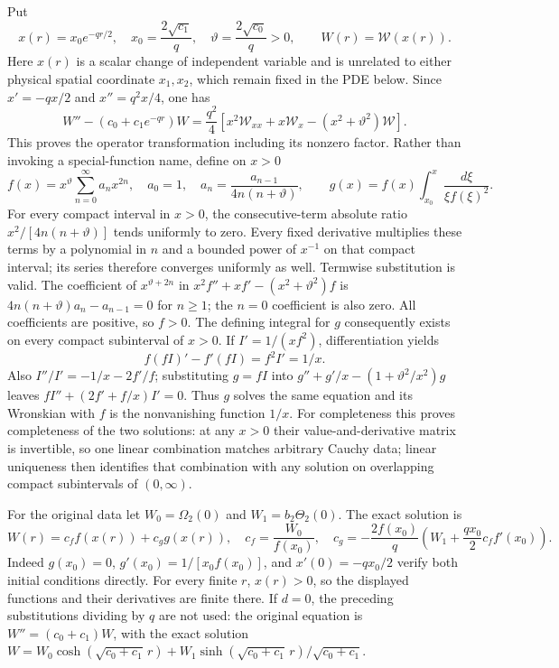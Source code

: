 Put
\[
 x(r)=x_0e^{-qr/2},\quad x_0=\frac{2\sqrt{c_1}}q,\quad
 \vartheta=\frac{2\sqrt{c_0}}q>0,\qquad W(r)=\mathcal W(x(r)).
\]
Here $x(r)$ is a scalar change of independent variable and is unrelated
to either physical spatial coordinate $x_1,x_2$, which remain fixed
in the PDE below. Since $x'=-qx/2$ and $x''=q^2x/4$, one has
\[
 W''-(c_0+c_1e^{-qr})W
 =\frac{q^2}4\left[x^2\mathcal W_{xx}+x\mathcal W_x
                         -(x^2+\vartheta^2)\mathcal W\right].
\]
This proves the operator transformation including its nonzero factor.
Rather than invoking a special-function name, define on $x>0$
\begin{equation}
 f(x)=x^{\vartheta}\sum_{n=0}^\infty a_nx^{2n},\quad
 a_0=1,\quad a_n=\frac{a_{n-1}}{4n(n+\vartheta)},\qquad
 g(x)=f(x)\int_{x_0}^x\frac{d\xi}{\xi f(\xi)^2}.
 \label{cvlane:eq:cv-feedback-fundamental}
\end{equation}
For every compact interval in $x>0$, the consecutive-term absolute
ratio $x^2/[4n(n+\vartheta)]$ tends uniformly to zero.
Every fixed derivative multiplies these terms by a polynomial in $n$
and a bounded power of $x^{-1}$ on that compact interval; its series
therefore converges uniformly as well. Termwise substitution is valid.
The coefficient of $x^{\vartheta+2n}$ in
$x^2f''+xf'-(x^2+\vartheta^2)f$ is
$4n(n+\vartheta)a_n-a_{n-1}=0$ for $n\geq1$; the $n=0$
coefficient is also zero. All coefficients are positive, so $f>0$.
The defining integral for $g$ consequently exists on every compact
subinterval of $x>0$. If $I'=1/(xf^2)$, differentiation yields
\[
 f(fI)' - f'(fI)=f^2I'=1/x.
\]
Also $I''/I'=-1/x-2f'/f$; substituting $g=fI$ into
$g''+g'/x-(1+\vartheta^2/x^2)g$ leaves
$fI''+(2f'+f/x)I'=0$. Thus $g$ solves the same equation and its
Wronskian with $f$ is the nonvanishing function $1/x$.
For completeness this proves completeness of the two solutions:
at any $x>0$ their value-and-derivative matrix is invertible, so one
linear combination matches arbitrary Cauchy data; linear uniqueness
then identifies that combination with any solution on overlapping
compact subintervals of $(0,\infty)$.

For the original data let $W_0=\Omega_2(0)$ and
$W_1=b_2\Theta_2(0)$. The exact solution is
\begin{equation}
 W(r)=c_ff(x(r))+c_gg(x(r)),\quad
 c_f=\frac{W_0}{f(x_0)},\quad
 c_g=-\frac{2f(x_0)}q\left(W_1+\frac{qx_0}{2}c_ff'(x_0)\right).
 \label{cvlane:eq:cv-feedback-initial-map}
\end{equation}
Indeed $g(x_0)=0$, $g'(x_0)=1/[x_0f(x_0)]$, and
$x'(0)=-qx_0/2$ verify both initial conditions directly.
For every finite $r$, $x(r)>0$, so the displayed functions and their
derivatives are finite there. If $d=0$, the preceding substitutions
dividing by $q$ are not used: the original equation is
$W''=(c_0+c_1)W$, with the exact solution
$W=W_0\cosh(\sqrt{c_0+c_1}\,r)
+W_1\sinh(\sqrt{c_0+c_1}\,r)/\sqrt{c_0+c_1}$.

